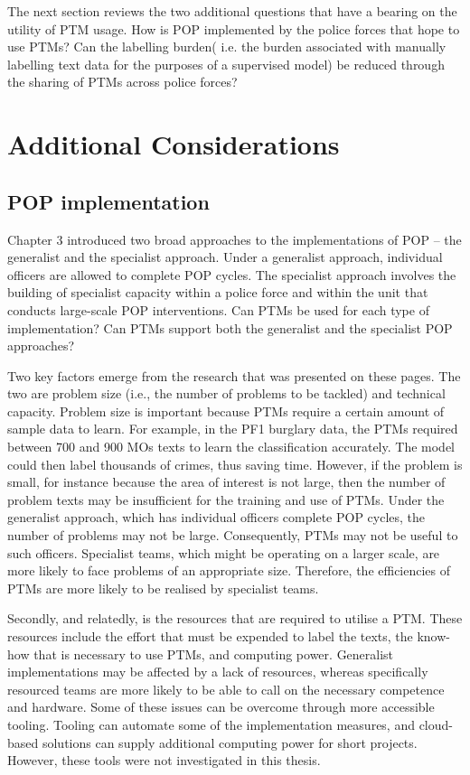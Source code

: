 The next section reviews the two additional questions that have a bearing on the utility of PTM usage. How is POP implemented by the police forces that hope to use PTMs? Can the labelling burden( i.e. the burden associated with manually labelling text data for the purposes of a supervised model) be reduced through the sharing of PTMs across police forces?

 
\section{Additional Considerations}
\subsection{POP implementation} Chapter 3 introduced two broad approaches to the implementations of POP – the generalist and the specialist approach. Under a generalist approach, individual officers are allowed to complete POP cycles. The specialist approach involves the building of specialist capacity within a police force and within the unit that conducts large-scale POP interventions. Can PTMs be used for each type of implementation? Can PTMs support both the generalist and the specialist POP approaches?

Two key factors emerge from the research that was presented on these pages. The two are problem size (i.e., the number of problems to be tackled) and technical capacity. Problem size is important because PTMs require a certain amount of sample data to learn. For example, in the PF1 burglary data, the PTMs required between 700 and 900 MOs texts to learn the classification accurately. The model could then label thousands of crimes, thus saving time. However, if the problem is small, for instance because the area of interest is not large, then the number of problem texts may be insufficient for the training and use of PTMs. Under the generalist approach, which has individual officers complete POP cycles, the number of problems may not be large. Consequently, PTMs may not be useful to such officers. Specialist teams, which might be operating on a larger scale, are more likely to face problems of an appropriate size. Therefore, the efficiencies of PTMs are more likely to be realised by specialist teams.

Secondly, and relatedly, is the resources that are required to utilise a PTM. These resources include the effort that must be expended to label the texts, the know-how that is necessary to use PTMs, and computing power. Generalist implementations may be affected by a lack of resources, whereas specifically resourced teams are more likely to be able to call on the necessary competence and hardware. Some of these issues can be overcome through more accessible tooling. Tooling can automate some of the implementation measures, and cloud-based solutions can supply additional computing power for short projects. However, these tools were not investigated in this thesis.

